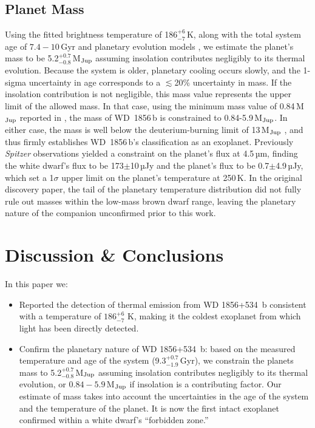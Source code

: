 \documentclass[twocolumn]{aastex631}
\begin{document}
\subsection{Planet Mass}

Using the fitted brightness temperature of 186$^{+6}_{-7}$\,K, along with the total system age of $7.4-10$\,Gyr and planetary evolution models \citep{2007ApJ...659.1661F,Marley2021}, we estimate the planet’s mass to be 5.2$^{+0.7}_{-0.8}$\,M$_{\rm Jup}$ assuming insolation contributes negligibly to its thermal evolution. { Because the system is older, planetary cooling occurs slowly, and the 1-sigma uncertainty in age corresponds to a $\lesssim$20\% uncertainty in mass.} If the insolation contribution is not negligible, this mass value represents the upper limit of the allowed mass. In that case, using the minimum mass value of 0.84\,M$_{\rm Jup}$ reported in \cite{2021AJ....162..296X}, the mass of WD~1856\,b is constrained to 0.84-5.9\,M$_{\rm Jup}$. In either case, the mass is well below the deuterium-burning limit of 13\,M$_{\rm Jup}$ \citep{2011ApJ...727...57S}, and thus firmly establishes WD~1856\,b's classification as an exoplanet. Previously \textit{Spitzer} observations \citep{Vanderburg_2020} yielded a constraint on the planet's flux at 4.5\,µm, finding the white dwarf's flux to be 173$\pm$10\,µJy and the planet's flux to be 0.7$\pm$4.9\,µJy, which set a 1$\sigma$ upper limit on the planet’s temperature at 250\,K. In the original discovery paper, the tail of the planetary temperature distribution did not fully rule out masses within the low-mass brown dwarf range, leaving the planetary nature of the companion unconfirmed prior to this work.


\section{Discussion \& Conclusions} \label{sec:discuss}

{ In this paper we:
\begin{itemize}
    \item Reported the detection of thermal emission from WD 1856+534~b consistent with a temperature of $186^{+6}_{-7}$ K, making it the coldest exoplanet from which light has been directly detected.
    \item Confirm the planetary nature of WD 1856+534~b: based on the measured temperature and age of the system (9.3$^{+0.7}_{-1.9}$\,Gyr), we constrain the planets mass to 5.2$^{+0.7}_{-0.8}$\,M$_{\rm Jup}$ assuming insolation contributes negligibly to its thermal evolution, or $0.84-5.9$\,M$_{\rm Jup}$ if insolation is a contributing factor. Our estimate of mass takes into account the uncertainties in the age of the system and the temperature of the planet. It is now the first intact exoplanet confirmed within a white dwarf’s “forbidden zone.” 
\end{itemize}
}
\end{document}
